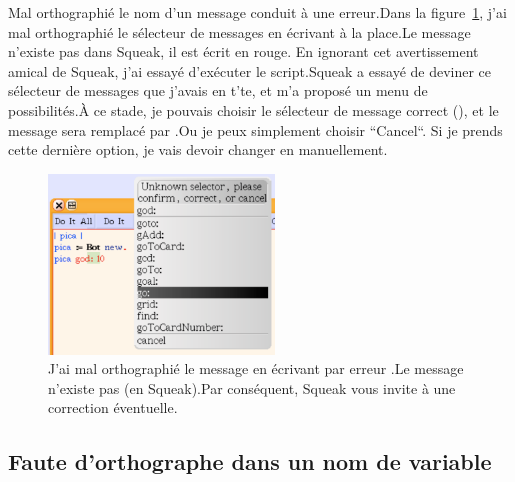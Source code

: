 \documentclass[a4paper,10pt,twoside]{book}
\begin{document}
Mal orthographi\'e le nom d'un message conduit \`a une erreur.Dans la figure~\ref{fig:unknowSelector}, j'ai mal orthographi\'e le s\'electeur de messages  en \'ecrivant  \`a la place.Le message  n'existe pas dans Squeak, il est \'ecrit en rouge. En ignorant cet avertissement amical de Squeak, j'ai essay\'e d'ex\'ecuter le script.Squeak a essay\'e de deviner ce s\'electeur de messages que j'avais en t'te, et m'a propos\'e un menu de possibilit\'es.\`A ce stade, je pouvais choisir le s\'electeur de message correct (), et le message  sera remplac\'e par .Ou je peux simplement choisir ``Cancel``. Si je prends cette derni\`ere option, je vais devoir changer  en   manuellement.

\begin{figure}[ht!]
\begin{center}\includegraphics[width=6cm]{6-errorOne}
\caption{J'ai mal orthographi\'e le message  en \'ecrivant par erreur .Le message  n'existe pas (en Squeak).Par cons\'equent, Squeak vous invite \`a une correction \'eventuelle. \label{fig:unknowSelector}}\end{center}
\end{figure}

\subsection{Faute d'orthographe dans un nom de variable}
\end{document}
